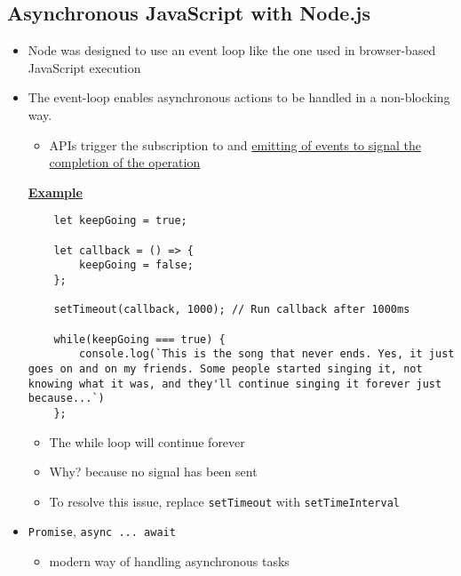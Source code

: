 \documentclass[12pt]{article}
\begin{document}
\subsection{Asynchronous JavaScript with Node.js}
\begin{itemize}
    \item Node was designed to use an event loop like the one used in browser-based JavaScript execution
    \item The event-loop enables asynchronous actions to be handled in a non-blocking way.
    \begin{itemize}
        \item APIs trigger the subscription to and \ul{emitting of events to signal the completion of the operation}
    \end{itemize}

    \underline{\textbf{Example}}

    \bigskip

    \begin{lstlisting}
    let keepGoing = true;

    let callback = () => {
        keepGoing = false;
    };

    setTimeout(callback, 1000); // Run callback after 1000ms

    while(keepGoing === true) {
        console.log(`This is the song that never ends. Yes, it just goes on and on my friends. Some people started singing it, not knowing what it was, and they'll continue singing it forever just because...`)
    };
    \end{lstlisting}

    \begin{itemize}
        \item The while loop will continue forever
        \item Why? because no signal has been sent
        \item To resolve this issue, replace \texttt{setTimeout} with \texttt{setTimeInterval}
    \end{itemize}
    \item \texttt{Promise}, \texttt{async ... await}
    \begin{itemize}
        \item modern way of handling asynchronous tasks
    \end{itemize}
\end{itemize}
\end{document}
